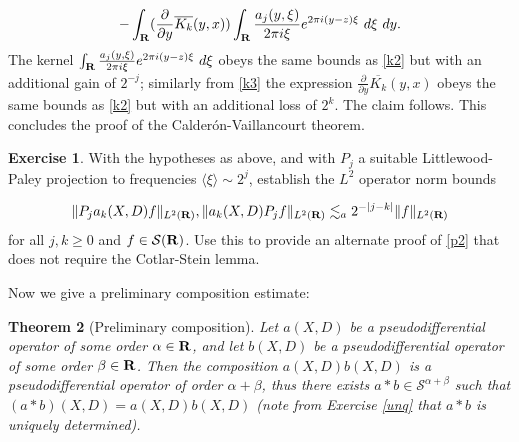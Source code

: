 \documentclass[11pt]{article}
\newtheorem{theorem}{Theorem}
\theoremstyle{definition}
\newtheorem{exercise}[theorem]{Exercise}
\theoremstyle{remark}
\begin{document}
\[\displaystyle  -\int_{\bf R} (\frac{\partial}{\partial y} \overline{K_k}(y,x)) \int_{\bf R} \frac{a_j(y,\xi)}{2\pi i \xi} e^{2\pi i (y-z) \xi}\ d\xi\ dy.\]
 The kernel \({\int_{\bf R} \frac{a_j(y,\xi)}{2\pi i \xi} e^{2\pi i (y-z) \xi}\ d\xi}\) obeys the same bounds as \eqref{k2} but with an additional gain of \({2^{-j}}\); similarly from \eqref{k3} the expression \({\frac{\partial}{\partial y} \overline{K_k}(y,x)}\) obeys the same bounds as \eqref{k2} but with an additional loss of \({2^k}\). The claim follows. This concludes the proof of the Calderón-Vaillancourt theorem.

\begin{exercise}
 \label{lp-a} With the hypotheses as above, and with \({P_j}\) a suitable Littlewood-Paley projection to frequencies \({\langle \xi \rangle \sim 2^j}\), establish the \({L^2}\) operator norm bounds 

\[\displaystyle  \| P_j a_k(X,D) f \|_{L^2({\bf R})}, \| a_k(X,D) P_j f \|_{L^2({\bf R})} \lesssim_a 2^{-|j-k|} \|f\|_{L^2({\bf R})}\]
 for all \({j,k \geq 0}\) and \({f \in {\mathcal S}({\bf R})}\). Use this to provide an alternate proof of \eqref{p2} that does not require the Cotlar-Stein lemma. 

\end{exercise}

Now we give a preliminary composition estimate:


\begin{theorem}[Preliminary composition]
 \label{precomp} Let \({a(X,D)}\) be a pseudodifferential operator of some order \({\alpha \in {\bf R}}\), and let \({b(X,D)}\) be a pseudodifferential operator of some order \({\beta \in {\bf R}}\). Then the composition \({a(X,D) b(X,D)}\) is a pseudodifferential operator of order \({\alpha+\beta}\), thus there exists \({a*b \in {\mathcal S}^{\alpha+\beta}}\) such that \({(a*b)(X,D) = a(X,D) b(X,D)}\) (note from Exercise \ref{unq} that \({a*b}\) is uniquely determined). 

\end{theorem}
\end{document}
